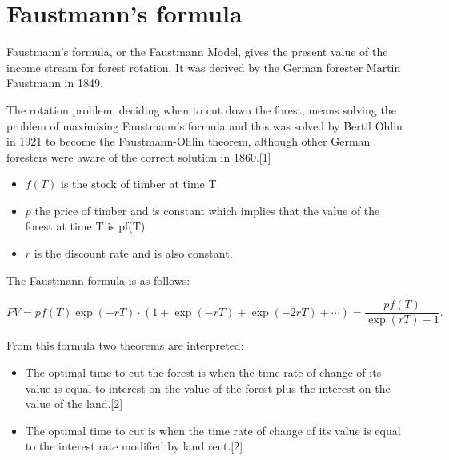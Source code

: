 \section{Faustmann's formula}
Faustmann's formula, or the Faustmann Model, gives the present value of the income stream for forest rotation. It was derived by the German forester Martin Faustmann in 1849.

The rotation problem, deciding when to cut down the forest, means solving the problem of maximising Faustmann's formula and this was solved by Bertil Ohlin in 1921 to become the Faustmann-Ohlin theorem, although other German foresters were aware of the correct solution in 1860.[1]

\begin{itemize}
\item    $f(T)$ is the stock of timber at time T
\item    $p$ the price of timber and is constant
    which implies that the value of the forest at time T is pf(T)
\item    $r$ is the discount rate and is also constant.
\end{itemize}

The Faustmann formula is as follows:

    \[{\displaystyle PV=pf(T)\exp(-rT)\cdot {(1+\exp(-rT)+\exp(-2rT)+\cdots )}={\frac {pf(T)}{\exp(rT)-1}}.} \]


From this formula two theorems are interpreted:
\begin{itemize}
\item    The optimal time to cut the forest is when the time rate of change of its value is equal to interest on the value of the forest plus the interest on the value of the land.[2]
\item    The optimal time to cut is when the time rate of change of its value is equal to the interest rate modified by land rent.[2]
\end{itemize}


